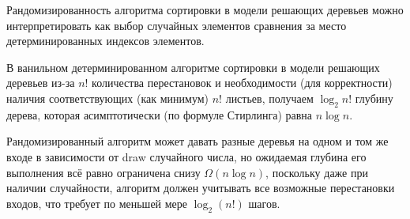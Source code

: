 \documentclass[11pt]{article}
\begin{document}
\begin{problem}{30}
\begin{enumerate}
			  \begin{solution}
				  Рандомизированность алгоритма сортировки в модели решающих деревьев можно интерпретировать как выбор случайных элементов сравнения за место детерминированных индексов элементов.
	
				  В ванильном детерминированном алгоритме сортировки в модели решающих деревьев из-за $ n! $ количества перестановок и необходимости (для корректности) наличия соответствующих (как минимум) $ n! $ листьев, получаем $ \log_2 n! $ глубину дерева, которая асимптотически (по формуле Стирлинга) равна $ n \log n $.
	
				  Рандомизированный алгоритм может давать разные деревья на одном и том же входе в зависимости от draw случайного числа, но ожидаемая глубина его выполнения всё равно ограничена снизу $\Omega(n \log n)$, поскольку даже при наличии случайности, алгоритм должен учитывать все возможные перестановки входов, что требует по меньшей мере $ \log_2 (n!) $ шагов.
			  \end{solution}
	\end{enumerate}
	\end{problem}
	
\end{document}
